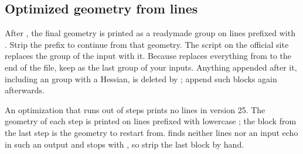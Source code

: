 \documentclass[letterpaper,10pt,english,openany,oneside]{sphinxmanual}
\begin{document}
\subsection{Optimized geometry from  lines}
\label{\detokenize{start/input-syntax:optimized-geometry-from-mol-lines}}
\sphinxAtStartPar
After , the final geometry is printed as a ready\sphinxhyphen{}made  group on lines prefixed with
. Strip the prefix to continue from that geometry. The  script on the official site replaces the 
group of the input with it. Because  replaces everything from  to the end of the file, keep
 as the last group of your inputs. Anything appended after it, including an  group with a
Hessian, is deleted by ; append such blocks again afterwards.



\sphinxAtStartPar
An optimization that runs out of steps prints no  lines in version 25. The geometry of each step is printed on
lines prefixed with lowercase ; the block from the last step is the geometry to restart from.  finds
neither  lines nor an input echo in such an output and stops with , so strip the last  block by
hand.
\end{document}
